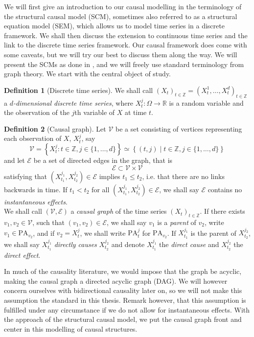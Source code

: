 \documentclass[11pt, a4paper]{memoir}
\theoremstyle{plain}
\theoremstyle{definition}
\newtheorem{defn}{Definition}
\newcommand{\mZ}{\mathbb{Z}}
\newcommand{\mR}{\mathbb{R}}
\begin{document}
We will first give an introduction to our causal modelling in the terminology of the structural causal model (SCM), sometimes also referred to as a structural equation model (SEM),  which allows us to model time series in a discrete framework. We shall then discuss the extension to continuous time series and the link to the discrete time series framework. Our causal framework does come with some caveats, but we will try our best to discuss them along the way. We will present the SCMs as done in \cite{Peters}, and we will freely use standard terminology from graph theory. We start with the central object of study.
\begin{defn}[Discrete time series]
We shall call $(X_t)_{t\in \mZ}=(X_t^{1},\ldots,X_{t}^d)_{t\in \mZ}$ a \emph{$d$-dimensional discrete time series}, where $X_t^j:\Omega\to \mR$ is a random variable and the observation of the $j$th variable of $X$ at time $t$.
\end{defn}
\begin{defn}[Causal graph]
Let $\mathcal{V}$ be a set consisting of vertices representing each observation of $X$, $X_t^j$, say $$\mathcal{V}=\left\{X_t^j: t\in \mZ,j\in\{1,\ldots,d\}\right\}\simeq \left\{(t,j)\mid t\in \mZ, j\in \{1,\ldots,d\}\right\}$$ and let $\mathcal{E}$ be a set of directed edges in the graph, that is 
$$\mathcal{E}\subset \mathcal{V}\times \mathcal{V}$$
satisfying that $(X_{t_1}^{j_1},X_{t_2}^{j_2})\in \mathcal{E}$ implies $t_1\leq t_2$, i.e. that there are no links backwards in time. If $t_1<t_2$ for all $(X_{t_1}^{j_1},X_{t_2}^{j_2})\in \mathcal{E}$, we shall say $\mathcal{E}$ contains no \emph{instantaneous effects}.\\
We shall call $(\mathcal{V}, \mathcal{E})$ a \emph{causal graph} of the time series $(X_t)_{t\in \mZ}$. If there exists $v_1,v_2\in \mathcal{V}$, such that $(v_1,v_2)\in \mathcal{E}$, we shall say $v_1$ is a \emph{parent} of $v_2$, write $v_1\in \text{PA}_{v_2}$, and if $v_2=X_t^j$, we shall write $\text{PA}_{t}^j$ for $\text{PA}_{v_2}$. If $X_{t_1}^{j_1}$ is the parent of $X_{t_2}^{j_2}$, we shall say $X_{t_1}^{j_1}$ \emph{directly causes} $X_{t_2}^{j_2}$ and denote $X_{t_1}^{j_1}$ the \emph{direct cause} and $X_{t_2}^{j_2}$ the \emph{direct effect}.
\end{defn}
In much of the causality literature, we would impose that the graph be acyclic, making the causal graph a directed acyclic graph (DAG). We will however concern ourselves with bidirectional causality later on, so we will not make this assumption the standard in this thesis. Remark however, that this assumption is fulfilled under any circumstance if we do not allow for instantaneous effects. With the approach of the structural causal model, we put the causal graph front and center in this modelling of causal structures.
\end{document}
